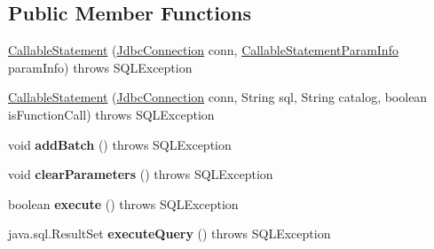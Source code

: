 \subsection*{Public Member Functions}
\begin{DoxyCompactItemize}
\item 
\mbox{\hyperlink{classcom_1_1mysql_1_1cj_1_1jdbc_1_1_callable_statement_aedac79a513af12d5af9a38c06593ae77}{Callable\+Statement}} (\mbox{\hyperlink{interfacecom_1_1mysql_1_1cj_1_1jdbc_1_1_jdbc_connection}{Jdbc\+Connection}} conn, \mbox{\hyperlink{classcom_1_1mysql_1_1cj_1_1jdbc_1_1_callable_statement_1_1_callable_statement_param_info}{Callable\+Statement\+Param\+Info}} param\+Info)  throws S\+Q\+L\+Exception 
\item 
\mbox{\hyperlink{classcom_1_1mysql_1_1cj_1_1jdbc_1_1_callable_statement_a87cbed70a05b60f543557c5158d65520}{Callable\+Statement}} (\mbox{\hyperlink{interfacecom_1_1mysql_1_1cj_1_1jdbc_1_1_jdbc_connection}{Jdbc\+Connection}} conn, String sql, String catalog, boolean is\+Function\+Call)  throws S\+Q\+L\+Exception 
\item 
\mbox{\label{classcom_1_1mysql_1_1cj_1_1jdbc_1_1_callable_statement_ae000145f4789826611e9e31158063446}} 
void {\bfseries add\+Batch} ()  throws S\+Q\+L\+Exception 
\item 
\mbox{\label{classcom_1_1mysql_1_1cj_1_1jdbc_1_1_callable_statement_afaafbaefee9ef17b104a40041ff17fac}} 
void {\bfseries clear\+Parameters} ()  throws S\+Q\+L\+Exception 
\item 
\mbox{\label{classcom_1_1mysql_1_1cj_1_1jdbc_1_1_callable_statement_aaa92dc9c08a10d95a69bfc5736f041a7}} 
boolean {\bfseries execute} ()  throws S\+Q\+L\+Exception 
\item 
\mbox{\label{classcom_1_1mysql_1_1cj_1_1jdbc_1_1_callable_statement_acb22796d45316e71fdb37c36865a954f}} 
java.\+sql.\+Result\+Set {\bfseries execute\+Query} ()  throws S\+Q\+L\+Exception 
\item 
\mbox{\label{classcom_1_1mysql_1_1cj_1_1jdbc_1_1_callable_statement_a2410d77057db5d681e4a80c74adfa1c2}} 

\end{DoxyCompactItemize}
